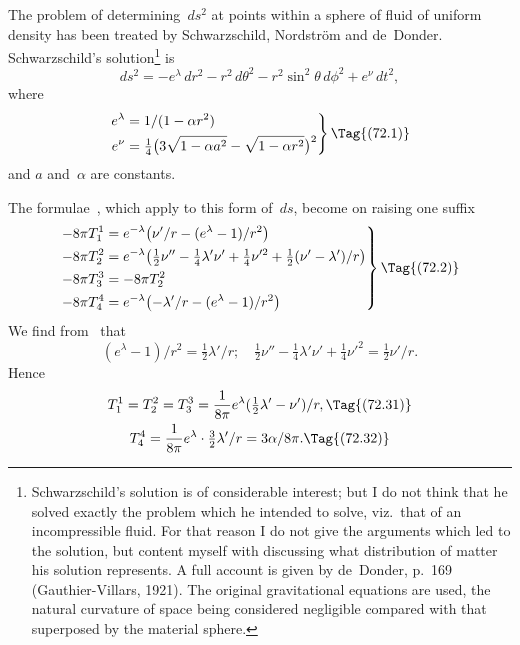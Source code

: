 \documentclass[12pt]{book}
\begin{document}
The problem of determining~$ds^{2}$ at points within a sphere of fluid of uniform
density has been treated by Schwarzschild, Nordström and de~Donder.
Schwarzschild's solution\footnote
  {Schwarzschild's solution is of considerable interest; but I do not think that he solved exactly
  the problem which he intended to solve, viz.\ that of an incompressible fluid. For that reason I do
  not give the arguments which led to the solution, but content myself with discussing what distribution
  of matter his solution represents. A full account is given by de~Donder,  p.~169 (Gauthier\hyp{}Villars, 1921). The original gravitational equations are used, the
  natural curvature of space being considered negligible compared with that superposed by the
  material sphere.}
is
\[
ds^{2} = -e^{\lambda}\, dr^{2} - r^{2}\, d\theta^2 - r^{2}\sin^{2}\theta\, d\phi^{2} + e^{\nu}\, dt^{2},
\]
where
\[
\left.
\begin{aligned}
  e^{\lambda} &= 1/(1 - \alpha r^{2}) \\
  e^{\nu} &= \tfrac{1}{4}\bigl(3\sqrt{1 - \alpha a^2} - \sqrt{1 - \alpha r^{2}}\bigr)^{2}
\end{aligned}
\right\}
\Tag{(72.1)}
\]
and $a$ and~$\alpha$ are constants.

The formulae~, which apply to this form of~$ds$, become on raising one
suffix
\[
\left.
\begin{aligned}
  -8\pi T_{1}^{1} &= e^{-\lambda} \bigl(\nu'/r - (e^{\lambda} - 1)/r^{2}\bigr)\\
  -8\pi T_{2}^{2} &= e^{-\lambda} \bigl(\tfrac{1}{2} \nu'' - \tfrac{1}{4}\lambda'\nu' + \tfrac{1}{4}\nu'^{2} + \tfrac{1}{2}(\nu' - \lambda')/r\bigr)\\
  -8\pi T_{3}^{3} &= -8\pi T_{2}^{2}\\
  -8\pi T_{4}^{4} &= e^{-\lambda} \bigl(-\lambda'/r - (e^{\lambda} - 1)/r^{2}\bigr)
\end{aligned}
\right\}
\Tag{(72.2)}
\]
We find from~ that
\[
(e^{\lambda} - 1)/r^{2} = \tfrac{1}{2}\lambda'/r;\quad
\tfrac{1}{2} \nu'' - \tfrac{1}{4}\lambda'\nu' + \tfrac{1}{4}\nu'^{2}  = \tfrac{1}{2}\nu'/r.
\]
Hence
\begin{gather*}
  T_{1}^{1} = T_{2}^{2} = T_{3}^{3} = \frac{1}{8\pi} e^{\lambda}(\tfrac{1}{2}\lambda' - \nu')/r,
\Tag{(72.31)} \\
T_{4}^{4} = \frac{1}{8\pi} e^{\lambda} \cdot \tfrac{3}{2}\lambda'/r
= 3\alpha/8\pi.
\Tag{(72.32)}
\end{gather*}
\end{document}
